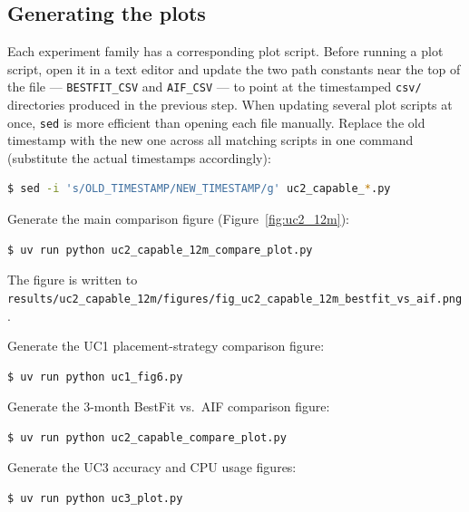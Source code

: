 \documentclass[11pt, a4paper]{article}
\begin{document}
\begin{appendices}
\subsection{Generating the plots}
\label{app:plots}

Each experiment family has a corresponding plot script.
Before running a plot script, open it in a text editor and update the two path
constants near the top of the file --- \texttt{BESTFIT\_CSV} and
\texttt{AIF\_CSV} --- to point at the timestamped \texttt{csv/} directories
produced in the previous step.
When updating several plot scripts at once, \texttt{sed} is more efficient than
opening each file manually.
Replace the old timestamp with the new one across all matching scripts in one
command (substitute the actual timestamps accordingly):

\begin{lstlisting}[language=bash]
$ sed -i 's/OLD_TIMESTAMP/NEW_TIMESTAMP/g' uc2_capable_*.py
\end{lstlisting}

Generate the main comparison figure (Figure~\ref{fig:uc2_12m}):

\begin{lstlisting}[language=bash]
$ uv run python uc2_capable_12m_compare_plot.py
\end{lstlisting}

The figure is written to\\
\texttt{results/uc2\_capable\_12m/figures/fig\_uc2\_capable\_12m\_bestfit\_vs\_aif.png}.

Generate the UC1 placement-strategy comparison figure:

\begin{lstlisting}[language=bash]
$ uv run python uc1_fig6.py
\end{lstlisting}

Generate the 3-month BestFit vs.\ AIF comparison figure:

\begin{lstlisting}[language=bash]
$ uv run python uc2_capable_compare_plot.py
\end{lstlisting}

Generate the UC3 accuracy and CPU usage figures:

\begin{lstlisting}[language=bash]
$ uv run python uc3_plot.py
\end{lstlisting}

\end{appendices}
\end{document}
